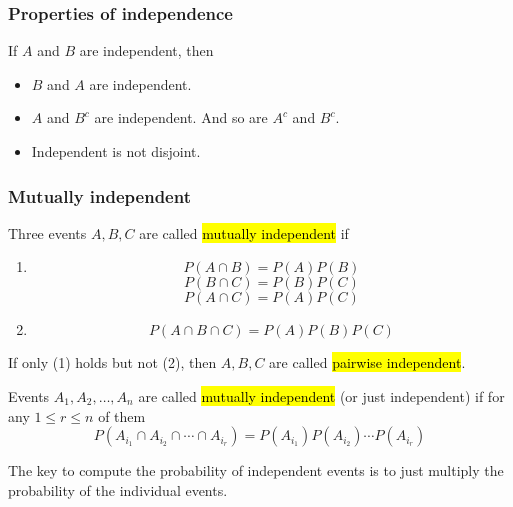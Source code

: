 \documentclass[slidestop,compress,mathserif]{beamer}
\begin{document}
\begin{frame}\frametitle{Properties of independence}
If $A$ and $B$ are independent, then
\begin{itemize}
\item $B$ and $A$ are independent.
\vspace{1.5cm}


\item $A$ and $B^c$ are independent. And so are $A^c$ and $B^c$.
\vspace{1.5cm}



\item Independent is not disjoint.

\vspace{1.5cm}



\end{itemize}

\end{frame}

\begin{frame}\frametitle{Mutually independent}

\begin{dinglist}{\DingListSymbolA}
\item Three events $A, B, C$ are called \hl{mutually independent} if
\begin{enumerate}
\item \[P(A \cap B) = P(A) P(B)\]
\[P(B \cap C) = P(B) P(C)\]
\[P(A \cap C) = P(A) P(C)\]
\item \[P(A \cap B \cap C) = P(A) P(B) P(C)\]
\end{enumerate}


\item If only (1) holds but not (2), then $A, B, C$ are called \hl{pairwise independent}.

\end{dinglist}

\end{frame}

\begin{frame}%

\begin{dinglist}{\DingListSymbolA}
\item Events $A_1, A_2, \ldots, A_n$ are called \hl{mutually independent} (or just independent) if
for any $1\leq r \leq n$ of them
 \[P(A_{i_1} \cap A_{i_2} \cap \cdots \cap A_{i_r}) = P(A_{i_1}) P(A_{i_2})  \cdots P(A_{i_r})\]


\item The key to compute the probability of independent events is to just multiply the probability of the individual events.
\end{dinglist}


\end{frame}
\end{document}
